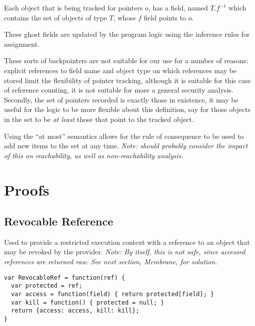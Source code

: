 \documentclass[a4paper]{article}
\begin{document}
Each object that is being tracked for pointers $o$, has a field, named $T.f^{-1}$
which contains the set of objects of type $T$, whose $f$ field
points to $o$.

These ghost fields are updated by the program logic using the inference rules
for assignment.

These sorts of backpointers are not suitable for our use for a number of
reasons: explicit references to field name and object type on
which references may be stored limit the flexibility of pointer tracking,
although it is suitable for this case of reference counting, it is not suitable
for more a general security analysis. Secondly, the set of pointers recorded is
exactly those in existence, it may be useful for the logic to be more flexible
about this definition, say for those objects in the set to be \emph{at least}
those that point to the tracked object.

Using the ``at most'' semantics allows for the rule of consequence to be used to
add new items to the set at any time. \emph{Note: should probably consider the
impact of this on reachability, as well as non-reachability analysis.}

\section{Proofs}
\subsection{Revocable Reference}
Used to provide a restricted execution context with a reference to an object
that may be revoked by the provider.
\emph{Note: By itself, this is not safe, since accessed references are returned
  raw. See next section, Membrane, for solution.}

\begin{verbatim}
var RevocableRef = function(ref) {
  var protected = ref;
  var access = function(field) { return protected[field]; }
  var kill = function() { protected = null; }
  return {access: access, kill: kill};
}
\end{verbatim}
\end{document}
